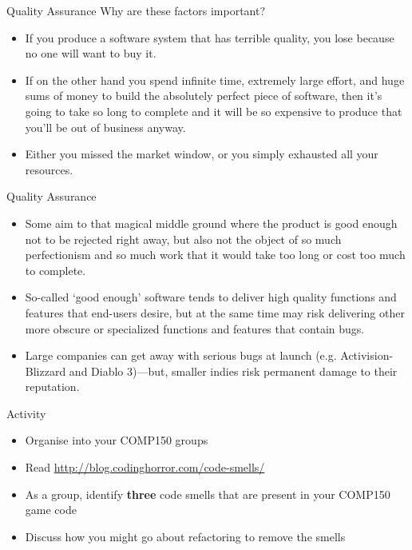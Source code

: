 \begin{frame}{Quality Assurance}
Why are these factors important? \pause

    \begin{itemize}
        \item If you produce a software system that has terrible quality, you lose because no one will want to buy it.  \pause
        \item If on the other hand you spend infinite time, extremely large effort, and huge sums of money to build the absolutely perfect piece of software,
         then it's going to take so long to complete and it will be so expensive to produce that you'll be out of business anyway.  \pause
        \item Either you missed the market window, or you simply exhausted all your resources. 
    \end{itemize}
\end{frame}

\begin{frame}{Quality Assurance}
    \begin{itemize}
        \item Some aim to that magical middle ground where the product is good enough not to be rejected right away, but also not the object of so much 
        perfectionism and so much work that it would take too long or cost too much to complete.  \pause
        \item So-called `good enough' software tends to deliver high quality functions and features that end-users desire, but at the same time may risk delivering
        other more obscure or specialized functions and features that contain bugs. \pause
        \item Large companies can get away with serious bugs at launch (e.g. Activision-Blizzard and Diablo 3)---but, smaller indies risk permanent damage to their reputation.
    \end{itemize}
\end{frame}

\begin{frame}{Activity}
    \begin{itemize}
        \item Organise into your COMP150 groups
        \item Read \url{http://blog.codinghorror.com/code-smells/}
        \item As a group, identify \textbf{three} code smells that are present in your COMP150 game code
        \item Discuss how you might go about refactoring to remove the smells
    \end{itemize}
\end{frame}

